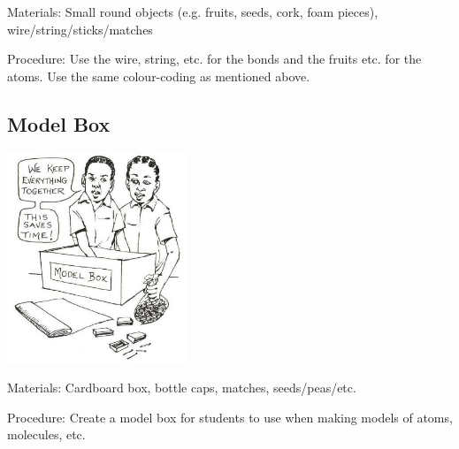 \begin{multicols}{2}
\begin{description*}
\item[Materials:]{Small round objects (e.g. fruits, seeds, cork, foam pieces), wire/string/sticks/matches}
\item[Procedure:]{Use the wire, string, etc. for the bonds and the fruits etc. for the atoms. Use the same colour-coding as mentioned above.}
\end{description*}

\vfill
\columnbreak

\subsection{Model Box}

\begin{center}
\includegraphics[width=0.4\textwidth]{./img/source/model-box.jpg}
\end{center}

\begin{description*}
\item[Materials:]{Cardboard box, bottle caps, matches, seeds/peas/etc.}
\item[Procedure:]{Create a model box for students to use when making models of atoms, molecules, etc.}
\end{description*}


\end{multicols}


\pagebreak